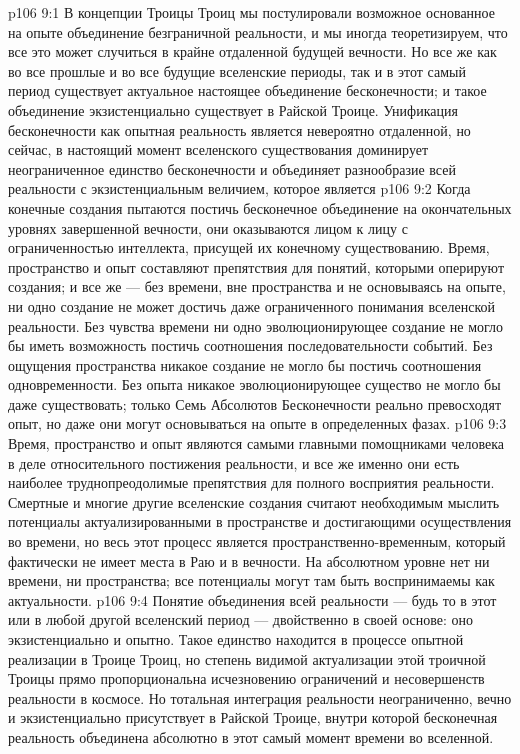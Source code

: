 \vs p106 9:1 В концепции Троицы Троиц мы постулировали возможное основанное на опыте объединение безграничной реальности, и мы иногда теоретизируем, что все это может случиться в крайне отдаленной будущей вечности. Но все же как во все прошлые и во все будущие вселенские периоды, так и в этот самый период существует актуальное настоящее объединение бесконечности; и такое объединение экзистенциально существует в Райской Троице. Унификация бесконечности как опытная реальность является невероятно отдаленной, но сейчас, в настоящий момент вселенского существования доминирует неограниченное единство бесконечности и объединяет разнообразие всей реальности с экзистенциальным величием, которое является 
\vs p106 9:2 Когда конечные создания пытаются постичь бесконечное объединение на окончательных уровнях завершенной вечности, они оказываются лицом к лицу с ограниченностью интеллекта, присущей их конечному существованию. Время, пространство и опыт составляют препятствия для понятий, которыми оперируют создания; и все же --- без времени, вне пространства и не основываясь на опыте, ни одно создание не может достичь даже ограниченного понимания вселенской реальности. Без чувства времени ни одно эволюционирующее создание не могло бы иметь возможность постичь соотношения последовательности событий. Без ощущения пространства никакое создание не могло бы постичь соотношения одновременности. Без опыта никакое эволюционирующее существо не могло бы даже существовать; только Семь Абсолютов Бесконечности реально превосходят опыт, но даже они могут основываться на опыте в определенных фазах.
\vs p106 9:3 Время, пространство и опыт являются самыми главными помощниками человека в деле относительного постижения реальности, и все же именно они есть наиболее труднопреодолимые препятствия для полного восприятия реальности. Смертные и многие другие вселенские создания считают необходимым мыслить потенциалы актуализированными в пространстве и достигающими осуществления во времени, но весь этот процесс является пространственно\hyp{}временным, который фактически не имеет места в Раю и в вечности. На абсолютном уровне нет ни времени, ни пространства; все потенциалы могут там быть воспринимаемы как актуальности.
\vs p106 9:4 Понятие объединения всей реальности --- будь то в этот или в любой другой вселенский период --- двойственно в своей основе: оно экзистенциально и опытно. Такое единство находится в процессе опытной реализации в Троице Троиц, но степень видимой актуализации этой троичной Троицы прямо пропорциональна исчезновению ограничений и несовершенств реальности в космосе. Но тотальная интеграция реальности неограниченно, вечно и экзистенциально присутствует в Райской Троице, внутри которой бесконечная реальность объединена абсолютно в этот самый момент времени во вселенной.
